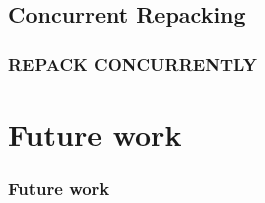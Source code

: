 \subsection{Concurrent Repacking}
\begin{frame}
	\frametitle{REPACK CONCURRENTLY}

%
%
%
%
\end{frame}


\section{Future work}
\begin{frame}
  \frametitle{Future work}
\end{frame}
